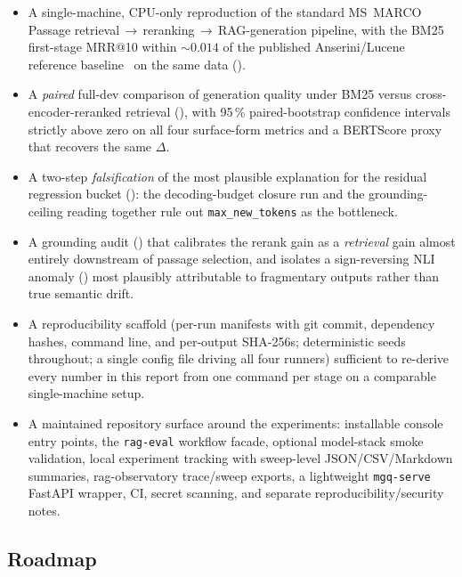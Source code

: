 \documentclass[11pt,a4paper]{article}
\newcommand{\msmarco}{MS~MARCO}
\newcommand{\bertscore}{BERTScore}
\newcommand{\bmtwofive}{BM25}
\newcommand{\barrow}{\,\allowbreak\ensuremath{\rightarrow}\allowbreak\,}
\begin{document}
\begin{itemize}
  \item A single-machine, CPU-only reproduction of the standard
        \msmarco{} Passage retrieval\barrow{}reranking\barrow{}RAG-generation
        pipeline, with the \bmtwofive{} first-stage MRR@10 within
        $\sim\!0.014$ of the published Anserini/Lucene reference
        baseline~\cite{lin2021pyserini} on the same data
        ().
  \item A \emph{paired} full-dev comparison of generation quality
        under \bmtwofive{} versus cross-encoder-reranked retrieval
        (), with 95\,\% paired-bootstrap
        confidence intervals strictly above zero on all four
        surface-form metrics and a \bertscore{} proxy that recovers
        the same $\Delta$.
  \item A two-step \emph{falsification} of the most plausible
        explanation for the residual regression bucket
        (): the decoding-budget closure run and
        the grounding-ceiling reading together rule out
        \texttt{max\_new\_tokens} as the bottleneck.
  \item A grounding audit () that calibrates the rerank
        gain as a \emph{retrieval} gain almost entirely downstream of
        passage selection, and isolates a sign-reversing NLI
        anomaly () most plausibly attributable to
        fragmentary outputs rather than true semantic drift.
  \item A reproducibility scaffold (per-run manifests with git
        commit, dependency hashes, command line, and per-output
        SHA-256s; deterministic seeds throughout; a single config
        file driving all four runners) sufficient to re-derive every
        number in this report from one command per stage on a
        comparable single-machine setup.
  \item A maintained repository surface around the experiments:
        installable console entry points, the \texttt{rag-eval}
        workflow facade, optional model-stack smoke validation,
        local experiment tracking with sweep-level JSON/CSV/Markdown
        summaries, rag-observatory trace/sweep exports, a lightweight
        \texttt{mgq-serve} FastAPI wrapper, CI, secret scanning, and
        separate reproducibility/security notes.
\end{itemize}

\subsection{Roadmap}
\end{document}
